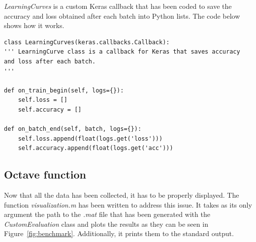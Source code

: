 \emph{\textit{LearningCurves}} is a custom Keras callback that has been coded to save the accuracy and loss obtained after each batch into Python lists. The code below shows how it works.
\begin{lstlisting}
class LearningCurves(keras.callbacks.Callback):
''' LearningCurve class is a callback for Keras that saves accuracy
and loss after each batch.
'''    

def on_train_begin(self, logs={}):
	self.loss = []
	self.accuracy = []

def on_batch_end(self, batch, logs={}):
	self.loss.append(float(logs.get('loss')))
	self.accuracy.append(float(logs.get('acc')))
\end{lstlisting}

\subsection{Octave function}\label{subsec:octave-func}
Now that all the data has been collected, it has to be properly displayed. The function \emph{\textit{visualization.m}} has been written to address this issue. It takes as its only argument the path to the \textit{.mat} file that has been generated with the \textit{CustomEvaluation} class and plots the results as they can be seen in Figure~\ref{fig:benchmark}. Additionally, it prints them to the standard output.

